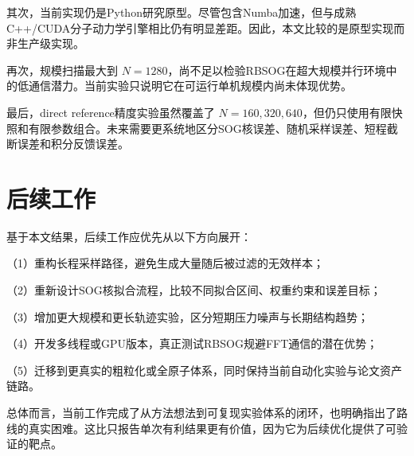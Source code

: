其次，当前实现仍是Python研究原型。尽管包含Numba加速，但与成熟C++/CUDA分子动力学引擎相比仍有明显差距。因此，本文比较的是原型实现而非生产级实现。

再次，规模扫描最大到 $N=1280$，尚不足以检验RBSOG在超大规模并行环境中的低通信潜力。当前实验只说明它在可运行单机规模内尚未体现优势。

最后，direct reference精度实验虽然覆盖了 $N=160,320,640$，但仍只使用有限快照和有限参数组合。未来需要更系统地区分SOG核误差、随机采样误差、短程截断误差和积分反馈误差。

\section{后续工作}

基于本文结果，后续工作应优先从以下方向展开：

（1）重构长程采样路径，避免生成大量随后被过滤的无效样本；

（2）重新设计SOG核拟合流程，比较不同拟合区间、权重约束和误差目标；

（3）增加更大规模和更长轨迹实验，区分短期压力噪声与长期结构趋势；

（4）开发多线程或GPU版本，真正测试RBSOG规避FFT通信的潜在优势；

（5）迁移到更真实的粗粒化或全原子体系，同时保持当前自动化实验与论文资产链路。

总体而言，当前工作完成了从方法想法到可复现实验体系的闭环，也明确指出了路线的真实困难。这比只报告单次有利结果更有价值，因为它为后续优化提供了可验证的靶点。
